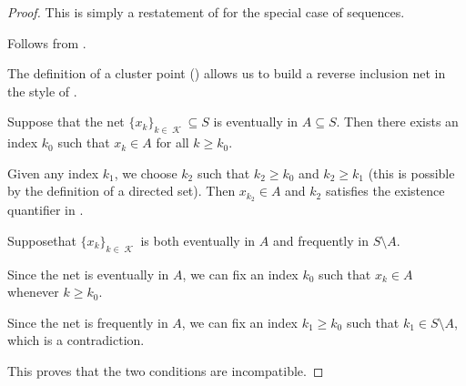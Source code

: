 \begin{proof}
   This is simply a restatement of  for the special case of sequences.

   Follows from .

  The definition of a cluster point () allows us to build a reverse inclusion net in the style of .

   Suppose that the net \( \{ x_k \}_{k \in \mscrK} \subseteq S \) is eventually in \( A \subseteq S \). Then there exists an index \( k_0 \) such that \( x_k \in A \) for all \( k \geq k_0 \).

  Given any index \( k_1 \), we choose \( k_2 \) such that \( k_2 \geq k_0 \) and \( k_2 \geq k_1 \) (this is possible by the definition of a directed set). Then \( x_{k_2} \in A \) and \( k_2 \) satisfies the existence quantifier in .

   Suppose\LEM that \( \{ x_k \}_{k \in \mscrK} \) is both eventually in \( A \) and frequently in \( S \setminus A \).

  Since the net is eventually in \( A \), we can fix an index \( k_0 \) such that \( x_k \in A \) whenever \( k \geq k_0 \).

  Since the net is frequently in \( A \), we can fix an index \( k_1 \geq k_0 \) such that \( k_1 \in S \setminus A \), which is a contradiction.

  This proves that the two conditions are incompatible.
\end{proof}

